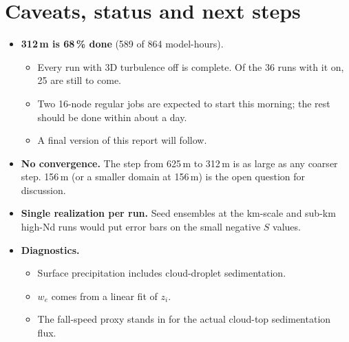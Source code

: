 \documentclass[10pt]{article}
\begin{document}
\section{Caveats, status and next steps}
\begin{itemize}
\item \textbf{312\,m is 68\,\% done} (589 of 864 model-hours).
\begin{itemize}
\item Every run with 3D turbulence off is complete. Of the 36 runs with it on, 25 are still to come.
\item Two 16-node regular jobs are expected to start this morning; the rest should be done within about a day.
\item A final version of this report will follow.
\end{itemize}
\item \textbf{No convergence.} The step from 625\,m to 312\,m is as large as any coarser step. 156\,m (or a smaller domain at 156\,m) is the open question for discussion.
\item \textbf{Single realization per run.} Seed ensembles at the km-scale and sub-km high-Nd runs would put error bars on the small negative $S$ values.
\item \textbf{Diagnostics.}
\begin{itemize}
\item Surface precipitation includes cloud-droplet sedimentation.
\item $w_e$ comes from a linear fit of $z_i$.
\item The fall-speed proxy stands in for the actual cloud-top sedimentation flux.
\end{itemize}
\end{itemize}
\end{document}
